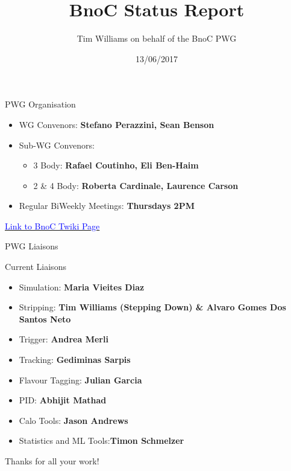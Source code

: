 \documentclass{beamer}
\title[BnoC Status Report]{BnoC Status Report}
\author[Tim Williams]{Tim Williams on behalf of the BnoC PWG}
\institute[Birmingham]{84th \lhcb week}
\date{13/06/2017}
\begin{document}
\begin{frame}
  \titlepage
\end{frame}

\begin{frame}{PWG Organisation}
  \begin{itemize}
  \item WG Convenors: \textbf{Stefano Perazzini, Sean Benson}
  \item Sub-WG Convenors:
    \begin{itemize}
    \item 3 Body: \textbf{Rafael Coutinho, Eli Ben-Haim}
    \item 2 \& 4 Body: \textbf{Roberta Cardinale, Laurence Carson}
    \end{itemize}
  \item Regular BiWeekly Meetings: \textbf{Thursdays 2PM}
  \end{itemize}
  \begin{center}
    \href{https://twiki.cern.ch/twiki/bin/viewauth/LHCbPhysics/BnoCTwikiPage}{\textcolor{blue}{Link to BnoC Twiki Page}}
  \end{center}
\end{frame}

\begin{frame}{PWG Liaisons}
  \begin{exampleblock}{Current Liaisons}
    \begin{itemize}
    \item Simulation: \textbf{Maria Vieites Diaz} \\
    \item Stripping: \textbf{Tim Williams (Stepping Down) \& Alvaro Gomes Dos Santos Neto} \\
    \item Trigger: \textbf{Andrea Merli} \\
    \item Tracking: \textbf{Gediminas Sarpis} \\
    \item Flavour Tagging: \textbf{Julian Garcia} \\
    \item PID: \textbf{Abhijit Mathad} \\
    \item Calo Tools: \textbf{Jason Andrews} \\
    \item Statistics and ML Tools:\textbf{Timon Schmelzer}
    \end{itemize}
  \end{exampleblock}
  \begin{center}
    \LARGE{Thanks for all your work!}
  \end{center}
\end{frame}
\end{document}
